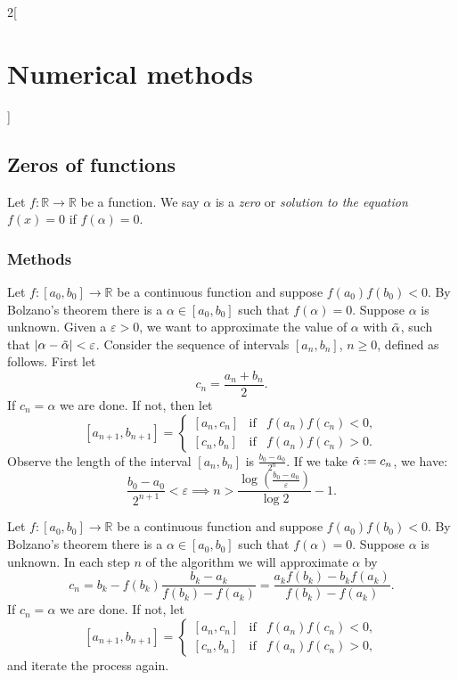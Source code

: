 \documentclass[class=article,10pt,crop=false]{standalone}
\begin{document}
\begin{multicols}{2}[\section{Numerical methods}]
\subsection{Zeros of functions}
\begin{definition}
Let $f:\mathbb{R}\rightarrow\mathbb{R}$ be a function. We say $\alpha$ is a \textit{zero} or \textit{solution to the equation $f(x)=0$} if $f(\alpha)=0$.
\end{definition}
\subsubsection*{Methods}
\begin{theorem}
Let $f:[a_0,b_0]\rightarrow\mathbb{R}$ be a continuous function and suppose $f(a_0)f(b_0)<0$. By Bolzano's theorem there is a $\alpha\in[a_0,b_0]$ such that $f(\alpha)=0$. Suppose $\alpha$ is unknown. Given a $\varepsilon>0$, we want to approximate the value of $\alpha$ with $\Tilde{\alpha}$, such that $|\alpha-\Tilde{\alpha}|<\varepsilon$. Consider the sequence of intervals $[a_n,b_n]$, $n\geq 0$, defined as follows. First let $$c_n=\frac{a_n+b_n}{2}.$$ If $c_n=\alpha$ we are done. If not, then let
$$[a_{n+1},b_{n+1}]=\left\{\begin{array}{ccc}
    [a_n,c_n] & \text{if} & f(a_n)f(c_n)<0, \\
    \left[c_n,b_n\right] & \text{if} & f(a_n)f(c_n)>0.
\end{array}\right.$$ Observe the length of the interval $[a_n,b_n]$ is $\frac{b_0-a_0}{2^n}$. If we take $\Tilde{\alpha}:=c_n$, we have: $$\frac{b_0-a_0}{2^{n+1}}<\varepsilon\implies n>\frac{\log\left(\frac{b_0-a_0}{\varepsilon}\right)}{\log 2}-1.$$
\end{theorem}
\begin{theorem}
Let $f:[a_0,b_0]\rightarrow\mathbb{R}$ be a continuous function and suppose $f(a_0)f(b_0)<0$. By Bolzano's theorem there is a $\alpha\in[a_0,b_0]$ such that $f(\alpha)=0$. Suppose $\alpha$ is unknown. In each step $n$ of the algorithm we will approximate $\alpha$ by $$c_n=b_k-f(b_k)\frac{b_k-a_k}{f(b_k)-f(a_k)}=\frac{a_kf(b_k)-b_kf(a_k)}{f(b_k)-f(a_k)}.$$ If $c_n=\alpha$ we are done. If not, let
$$[a_{n+1},b_{n+1}]=\left\{\begin{array}{ccc}
    [a_n,c_n] & \text{if} & f(a_n)f(c_n)<0, \\
    \left[c_n,b_n\right] & \text{if} & f(a_n)f(c_n)>0,
\end{array}\right.$$ and iterate the process again.

\end{theorem}
\end{multicols}
\end{document}

